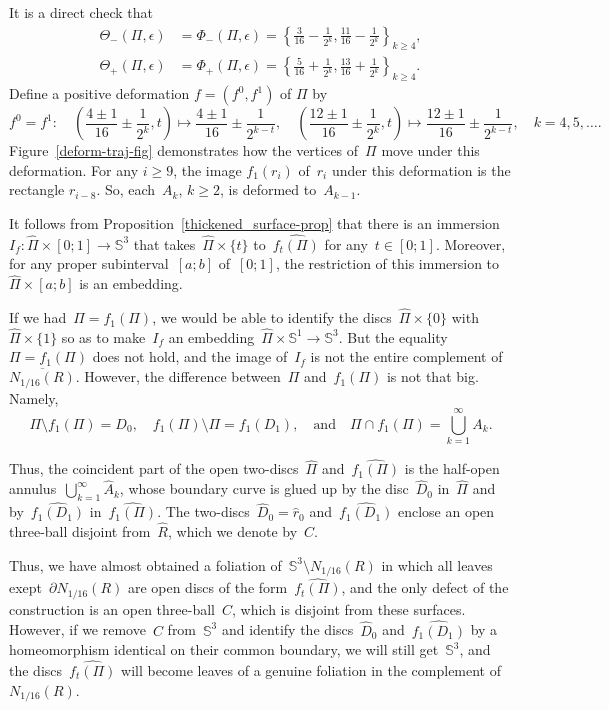 \documentclass{amsart}
\theoremstyle{theorem}
\theoremstyle{remark}
\theoremstyle{definition}
\numberwithin{equation}{section}
\numberwithin{figure}{section}
\begin{document}
It is a direct check that
$$\begin{aligned}
    \Theta_-(\Pi, \epsilon) &= \Phi_-(\Pi, \epsilon)=\left\{\frac{3}{16}-\frac{1}{2^k}, \frac{11}{16}-\frac{1}{2^k}\right\}_{k\geqslant4},\\
    \Theta_+(\Pi, \epsilon) &= \Phi_+(\Pi, \epsilon)=\left\{\frac{5}{16}+\frac{1}{2^k}, \frac{13}{16} + \frac{1}{2^k}\right\}_{k\geqslant4}.    
    \end{aligned}$$
Define a positive deformation $f = (f^0, f^1)$ of $\Pi$ by
$$
    f^0=f^1 : \quad
        \left(\frac{4\pm1}{16}\pm\frac{1}{2^{k}}, t\right)\mapsto \frac{4\pm1}{16}\pm\frac{1}{2^{k - t}},\quad
        \left(\frac{12\pm1}{16}\pm\frac{1}{2^{k}}, t\right)\mapsto \frac{12\pm1}{16}\pm\frac{1}{2^{k - t}}, \quad  k=4, 5,\ldots.
$$
Figure~\ref{deform-traj-fig} demonstrates how the vertices of~$\Pi$ move under this deformation.
For any $i\geqslant9$, the image $f_1(r_{i})$ of~$r_i$ under this deformation  is the rectangle $r_{i-8}$.
So, each~$A_k$, $k\geqslant2$, is deformed to~$A_{k-1}$.

It follows from Proposition~\ref{thickened_surface-prop} that there is an immersion~$I_f:\widehat\Pi\times[0;1]\rightarrow\mathbb S^3$
that takes~$\widehat\Pi\times\{t\}$ to~$\widehat{f_t(\Pi)}$ for any~$t\in[0;1]$. Moreover, for any proper
subinterval~$[a;b]$ of~$[0;1]$, the restriction of this immersion to~$\widehat\Pi\times[a;b]$ is an embedding.

If we had~$\Pi=f_1(\Pi)$, we would be able to identify the discs~$\widehat\Pi\times\{0\}$ with~$\widehat\Pi\times\{1\}$
so as to make~$I_f$ an embedding~$\widehat\Pi\times\mathbb S^1\rightarrow\mathbb S^3$. But the equality~$\Pi=f_1(\Pi)$ does
not hold, and the image of~$I_f$ is not the entire complement of~$\overline{N_{1/16}(R)}$.
However, the difference between~$\Pi$ and~$f_1(\Pi)$ is not that big. Namely,
$$\Pi\setminus f_1(\Pi)=D_0,\quad
f_1(\Pi)\setminus\Pi=f_1(D_1),\quad
\text{and}\quad
\Pi\cap f_1(\Pi)=\bigcup_{k=1}^\infty A_k.$$

Thus, the coincident part of the open two-discs~$\widehat\Pi$ and~$\widehat{f_1(\Pi)}$ is the half-open
annulus~$\bigcup_{k=1}^\infty\widehat A_k$, whose boundary curve is glued up by
the disc~$\widehat D_0$ in~$\widehat\Pi$ and by~$\widehat{f_1(D_1)}$ in~$\widehat{f_1(\Pi)}$.
The two-discs~$\widehat D_0=\widehat r_0$ and~$\widehat{f_1(D_1)}$ enclose
an open three-ball disjoint from~$\widehat R$, which we denote by~$C$.

Thus, we have almost obtained a foliation of~$\mathbb S^3\setminus N_{1/16}(R)$ in which all leaves
exept~$\partial N_{1/16}(R)$ are open discs of the form~$\widehat{f_t(\Pi)}$,
and the only defect of the construction is an open three-ball~$C$, which is disjoint from these surfaces.
However, if we remove~$C$ from~$\mathbb S^3$ and
identify the discs~$\widehat D_0$ and~$\widehat{f_1(D_1)}$
by a homeomorphism identical on their common boundary, we will still get~$\mathbb S^3$, and
the discs~$\widehat{f_t(\Pi)}$ will become leaves of a genuine foliation in the complement of~$N_{1/16}(R)$.
\end{document}
